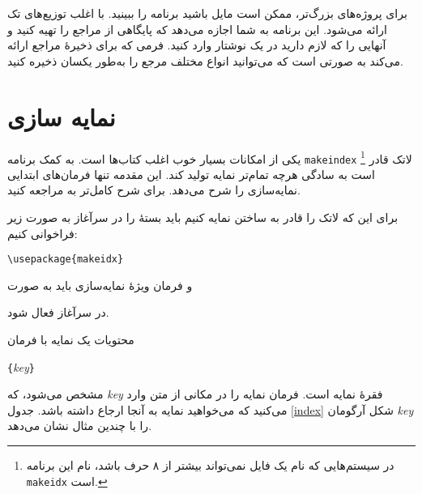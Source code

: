 برای پروژه‌های بزرگ‌تر، ممکن است مایل باشید برنامه  را ببینید.  با اغلب توزیع‌های تک ارائه می‌شود. این برنامه به شما اجازه می‌دهد که پایگاهی از مراجع را تهیه کنید و آنهایی را که لازم دارید در یک نوشتار‌ وارد کنید. فرمی که  برای ذخیرهٔ مراجع ارائه می‌کند به صورتی است که می‌توانید انواع مختلف مرجع را به‌طور یکسان ذخیره کنید.


\section{نمایه سازی}\label{sec:indexing}
یکی از امکانات بسیار خوب اغلب کتاب‌ها  
است. به کمک برنامه 
\texttt{makeindex} 
\footnote{در سیستم‌هایی که نام یک فایل نمی‌تواند بیشتر از ۸ حرف باشد، نام این برنامه \texttt{makeidx} است.} 
لاتک قادر است به سادگی هرچه تمام‌تر نمایه تولید کند. این مقدمه تنها فرمان‌های ابتدایی نمایه‌سازی را شرح می‌دهد. برای شرح کامل‌تر به  \companion مراجعه کنید.   

برای این که لاتک را قادر به ساختن نمایه کنیم باید بستهٔ 
 را در سرآغاز به صورت زیر فراخوانی کنیم:
\begin{lscommand}
\verb|\usepackage{makeidx}|
\end{lscommand}
\noindent و فرمان ویژهٔ نمایه‌سازی باید به صورت 
\begin{lscommand}
\end{lscommand}
\noindent در سرآغاز فعال شود.

محتویات یک نمایه با فرمان
\begin{lscommand}
  \verb|{|\emph{key}\verb|}|
\end{lscommand}
\noindent 
مشخص می‌شود، که 
\emph{key} 
فقرهٔ نمایه است. فرمان نمایه را در مکانی از متن وارد می‌کنید که می‌خواهید نمایه به آنجا ارجاع داشته باشد. جدول 
\ref{index}
شکل آرگومان 
\emph{key} 
را با چندین مثال نشان می‌دهد.

